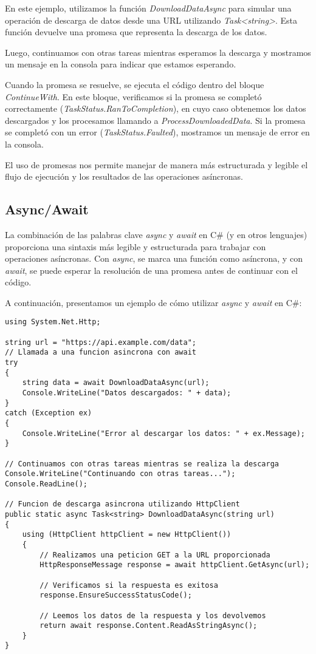 \documentclass[executivepaper]{article}
\begin{document}
En este ejemplo, utilizamos la función \emph{DownloadDataAsync} para simular una operación de descarga de datos desde una URL utilizando \emph{Task<string>}. Esta función devuelve una promesa que representa la descarga de los datos.

Luego, continuamos con otras tareas mientras esperamos la descarga y mostramos un mensaje en la consola para indicar que estamos esperando.

Cuando la promesa se resuelve, se ejecuta el código dentro del bloque \emph{ContinueWith}. En este bloque, verificamos si la promesa se completó correctamente (\emph{TaskStatus.RanToCompletion}), en cuyo caso obtenemos los datos descargados y los procesamos llamando a \emph{ProcessDownloadedData}. Si la promesa se completó con un error (\emph{TaskStatus.Faulted}), mostramos un mensaje de error en la consola.

El uso de promesas nos permite manejar de manera más estructurada y legible el flujo de ejecución y los resultados de las operaciones asíncronas.    

\subsection{Async/Await}

La combinación de las palabras clave \emph{async} y \emph{await} en C\# (y en otros lenguajes) proporciona una sintaxis más legible y estructurada para trabajar con operaciones asíncronas. Con \emph{async}, se marca una función como asíncrona, y con \emph{await}, se puede esperar la resolución de una promesa antes de continuar con el código.

A continuación, presentamos un ejemplo de cómo utilizar \emph{async} y \emph{await} en C\#:

\begin{lstlisting}
using System.Net.Http;

string url = "https://api.example.com/data";
// Llamada a una funcion asincrona con await
try
{
    string data = await DownloadDataAsync(url);
    Console.WriteLine("Datos descargados: " + data);
}
catch (Exception ex)
{
    Console.WriteLine("Error al descargar los datos: " + ex.Message);
}

// Continuamos con otras tareas mientras se realiza la descarga
Console.WriteLine("Continuando con otras tareas...");
Console.ReadLine();

// Funcion de descarga asincrona utilizando HttpClient
public static async Task<string> DownloadDataAsync(string url)
{
    using (HttpClient httpClient = new HttpClient())
    {
        // Realizamos una peticion GET a la URL proporcionada
        HttpResponseMessage response = await httpClient.GetAsync(url);

        // Verificamos si la respuesta es exitosa
        response.EnsureSuccessStatusCode();

        // Leemos los datos de la respuesta y los devolvemos
        return await response.Content.ReadAsStringAsync();
    }
}

\end{lstlisting}
\end{document}
